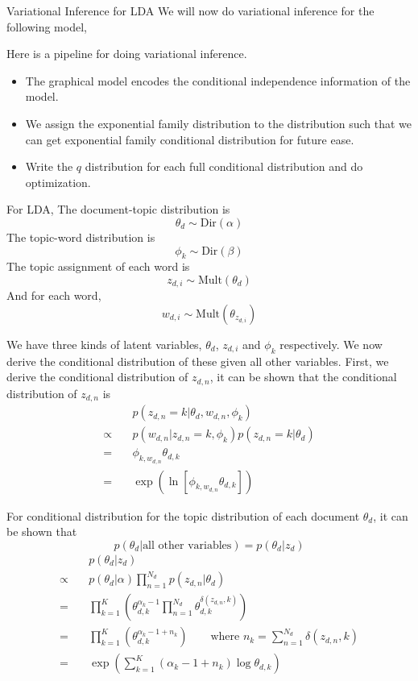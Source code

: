     \begin{frame}[allowframebreaks]{Variational Inference for LDA}
    We will now do variational inference for the following model,
    
    Here is a pipeline for doing variational inference.
    \begin{itemize}
    \item The graphical model encodes the conditional independence information of the model.
    \item We assign the exponential family distribution to the distribution such that we can get exponential family conditional distribution for future ease.
    \item Write the $q$ distribution for each full conditional distribution and do optimization.
    \end{itemize}
    
    \framebreak
    For LDA,
    The document-topic distribution is 
    $$\theta_d \sim \text{Dir}(\alpha)$$
    The topic-word distribution is
    $$\phi_k \sim \text{Dir}(\beta)$$
    The topic assignment of each word is
    $$ z_{d,i} \sim \text{Mult}(\theta_d)$$
    And for each word, 
    $$ w_{d,i} \sim \text{Mult}(\theta_{z_{d,i}})$$
    
    \framebreak
    We have three kinds of latent variables, $\theta_d$, $z_{d,i}$ and $\phi_k$ respectively. We now derive the conditional distribution of these given all other variables.
    First, we derive the conditional distribution of $z_{d,n}$, it can be shown that the conditional distribution of $z_{d,n}$ is
    \begin{align*}
    & p(z_{d,n} = k | \theta_d, w_{d,n}, \phi_k)\\
    \propto \quad & p(w_{d,n} | z_{d,n} = k, \phi_k) p(z_{d,n} = k | \theta_d)\\
    = \quad & \phi_{k, w_{d,n}} \theta_{d,k} \\
    = \quad & \exp (\ln [\phi_{k, w_{d,n}}\theta_{d,k}])
    \end{align*}
    \framebreak
    
    For conditional distribution for the topic distribution of each document $\theta_d$, it can be shown that $$p(\theta_d | \text{all other variables}) = p(\theta_d | z_d)$$
    \begin{align*}
    & p(\theta_d | z_d) \\
    \propto \quad &  p(\theta_d | \alpha) \prod_{n=1}^{N_d} p(z_{d,n} | \theta_d)\\
    = \quad & \prod_{k=1}^K (\theta_{d,k}^{\alpha_k - 1} \prod_{n=1}^{N_d} \theta_{d,k}^{\delta(z_{d,n}, k)})\\
    = \quad & \prod_{k=1}^K (\theta_{d,k}^{\alpha_k - 1 + n_k}) \qquad \text{where } n_k = \sum_{n=1}^{N_d} \delta(z_{d,n}, k) \\
    = \quad & \exp (\sum_{k=1}^K (\alpha_k - 1 + n_k) \log \theta_{d,k}) 
    \end{align*}
    

\end{frame}
